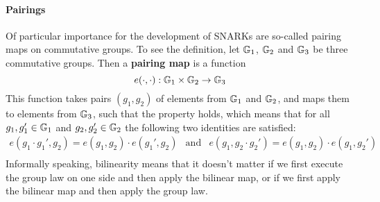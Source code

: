
\paragraph{Pairings}
Of particular importance for the development of SNARKs are so-called pairing maps on commutative groups. To see the definition, let $\mathbb{G}_1$, $\mathbb{G}_2$ and $\mathbb{G}_3$ be three commutative groups. Then a \textbf{pairing map} is a function
\begin{equation}\label{pairing-map}
e(\cdot,\cdot): \mathbb{G}_1 \times \mathbb{G}_2 \to \mathbb{G}_3
\end{equation}
This function takes pairs $(g_1,g_2)$ of elements from $\mathbb{G}_1$ and $\mathbb{G}_2$, and maps them to elements from $\mathbb{G}_3$, such that the  property holds, which means that for all $g_1,g_1'\in \mathbb{G}_1$ and $g_2, g_2'\in \mathbb{G}_2$ the following two identities are satisfied:
\begin{equation}
\begin{array}{lcr}
e(g_1 \cdot g_1',g_2)= e(g_1,g_2)\cdot e(g_1',g_2) &\text{and}&
e(g_1,g_2 \cdot g_2')= e(g_1,g_2)\cdot e(g_1,g_2')\\
\end{array}
\end{equation}
Informally speaking, bilinearity means that it doesn't matter if we first execute the group law on one side and then apply the bilinear map, or if we first apply the bilinear map and then apply the group law. 

